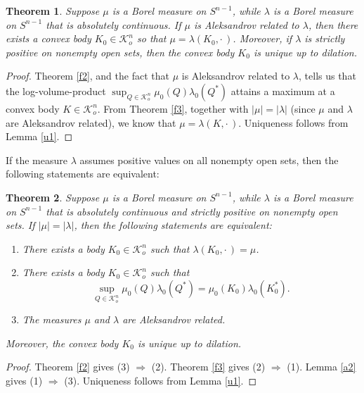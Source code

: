 \documentclass{cpamart1}     %
\newtheorem{theo}{Theorem}[section]
\theoremstyle{definition}
\theoremstyle{remark}
\newcommand{\sn}{S^{n-1}}
\newcommand{\kno}{\mathcal K^n_o}
\begin{document}
\begin{theo}\label{f4}
Suppose $\mu$ is a Borel measure on $\sn$, while 
$\lambda$ is a Borel measure on $\sn$ that is absolutely continuous.
If $\mu$ is Aleksandrov related to $\lambda$,
then there exists a convex body $K_0\in\kno$ so that $\mu =\lambda(K_0,\cdot\,)$.
Moreover, if $\lambda$ is strictly positive on nonempty open sets, then the convex body $K_0$
is unique up to dilation.
\end{theo}

\begin{proof}
Theorem \ref{f2}, and the fact that
$\mu$ is Aleksandrov related to $\lambda$, tells us that
the log-volume-product $\sup_{Q\in\kno}\mu_0(Q)\lambda_0(Q^*)$
attains
a maximum at a convex body $K\in \kno$. From Theorem \ref{f3}, together with $|\mu|=|\lambda|$ (since $\mu$ and $\lambda$ are Aleksandrov related), we know that $\mu = \lambda(K,\cdot\,)$.
Uniqueness follows from Lemma \ref{u1}.
\end{proof}




If the measure $\lambda$ assumes positive values on all nonempty open sets,
then the following statements are equivalent:

\begin{theo}\label{f6}
Suppose $\mu$ is a Borel measure on $\sn$, while
$\lambda$ is a Borel measure on $\sn$ that is absolutely continuous and strictly positive on nonempty open sets. If
$|\mu|=|\lambda|$, then the following statements are equivalent:
\begin{enumerate}
\item There exists a body $K_0\in \kno$ such that 
$\lambda(K_0,\cdot\,)=\mu$.
\item 
There exists a body $K_0\in\kno$ such that
\begin{equation*}
\sup_{Q\in\kno}\mu_0(Q)\lambda_0(Q^*)
=\mu_0(K_0)\lambda_0(K_0^*).    
\end{equation*}
\item The measures $\mu$ and $\lambda$ are Aleksandrov related.
\end{enumerate}
Moreover, the convex body $K_0$ is unique up to dilation.
\end{theo}


\begin{proof}
Theorem \ref{f2} gives (3) $\Rightarrow$ (2).
Theorem \ref{f3} gives (2) $\Rightarrow$ (1).
Lemma \ref{a2} gives (1) $\Rightarrow$ (3).
Uniqueness follows from Lemma \ref{u1}.
\end{proof}
\end{document}
